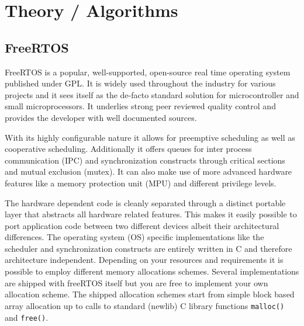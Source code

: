 

\chapter{Theory / Algorithms}

\section{FreeRTOS}

FreeRTOS is a popular, well-supported, open-source real time operating system published under GPL. It is widely used throughout the industry for various projects and it sees itself as the de-facto standard solution for microcontroller and small microprocessors. It underlies strong peer reviewed quality control and provides the developer with well documented sources.

With its highly configurable nature it allows for preemptive scheduling as well as cooperative scheduling. Additionally it offers queues for inter process communication (IPC) and synchronization constructs through critical sections and mutual exclusion (mutex). It can also make use of more advanced hardware features like a memory protection unit (MPU) and different privilege levels.

The hardware dependent code is cleanly separated through a distinct portable layer that abstracts all hardware related features. This makes it easily possible to port application code between two different devices albeit their architectural differences. The operating system (OS) specific implementations like the scheduler and synchronization constructs are entirely written in C and therefore architecture independent. Depending on your resources and requirements it is possible to employ different memory allocations schemes. Several implementations are shipped with freeRTOS itself but you are free to implement your own allocation scheme. The shipped allocation schemes start from simple block based array allocation up to calls to standard (newlib) C library functions \verb+malloc()+ and \verb+free()+.

